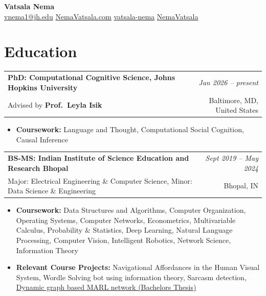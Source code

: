 \documentclass[10pt, letterpaper]{article}
\begin{document}
\begin{center}
  {\LARGE\bfseries\color{accent} Vatsala Nema}\\[6pt]
  \small
  \faEnvelope\;\href{mailto:vnema1@jh.edu}{vnema1@jh.edu}\quad
  \faGlobe\;\href{https://nemavats.github.io}{NemaVatsala.com}\quad
  \faLinkedin\;\href{https://linkedin.com/in/vatsala-nema}{vatsala-nema}\quad
  \faGithub\;\href{https://github.com/NemaVatsala}{NemaVatsala}
\end{center}

\vspace{4pt}

\section{Education}

\begin{tabularx}{\linewidth}{@{}X r@{}}
  \small\textbf{PhD: Computational Cognitive Science, Johns Hopkins University}
    & \small\textit{Jan 2026 – present} \\
  \small Advised by \textbf{Prof.\ Leyla Isik}
    & \small Baltimore, MD, United States \\
\end{tabularx}

\begin{itemize}
  \item \textbf{Coursework:} Language and Thought, Computational Social Cognition, Causal Inference 
\end{itemize}

\begin{tabularx}{\linewidth}{@{}X r@{}}
  \small\textbf{BS-MS: Indian Institute of Science Education and Research Bhopal}
    & \small\textit{Sept 2019 – May 2024} \\
  \small Major: Electrical Engineering \& Computer Science,
    Minor: Data Science \& Engineering
    & \small Bhopal, IN \\
\end{tabularx}

\begin{itemize}
  \item \textbf{Coursework:} Data Structures and Algorithms, Computer Organization,
        Operating Systems, Computer Networks, Econometrics, Multivariable Calculus,
        Probability \& Statistics, Deep Learning, Natural Language Processing,
        Computer Vision, Intelligent Robotics, Network Science, Information Theory
  \item \textbf{Relevant Course Projects:}
        Navigational Affordances in the Human Visual System,
        Wordle Solving bot using information theory,
        Sarcasm detection,
        \href{https://drive.google.com/file/d/1m7s9vA5SOsqKsISnabPprTS1i-2paf4h/view?usp=share_link}{Dynamic graph based MARL network (Bachelors Thesis)}
\end{itemize}
\end{document}
